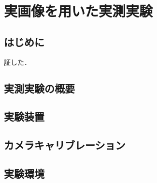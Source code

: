 \chapter{実画像を用いた実測実験}
\thispagestyle{empty}
\label{chap5}
\minitoc

\newpage
\section{はじめに}
証した．

\newpage

\section{実測実験の概要}


\newpage

\section{実験装置}



\newpage

\section{カメラキャリブレーション}

\newpage

\section{実験環境}

